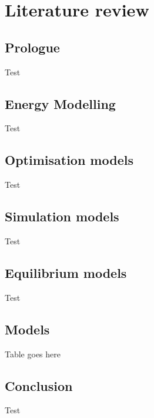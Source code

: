 \chapter{Literature review}
\label{chapter:litreview}
\ifpdf
    \graphicspath{{Chapter3/Figs/Raster/}{Chapter3/Figs/PDF/}{Chapter3/Figs/}}
\else
    \graphicspath{{Chapter3/Figs/Vector/}{Chapter3/Figs/}}
\fi

\section{Prologue}

Test

\section{Energy Modelling}

Test

\section{Optimisation models}

Test

\section{Simulation models}

Test

\section{Equilibrium models}

Test

\section{Models}

Table goes here

\section{Conclusion}

Test